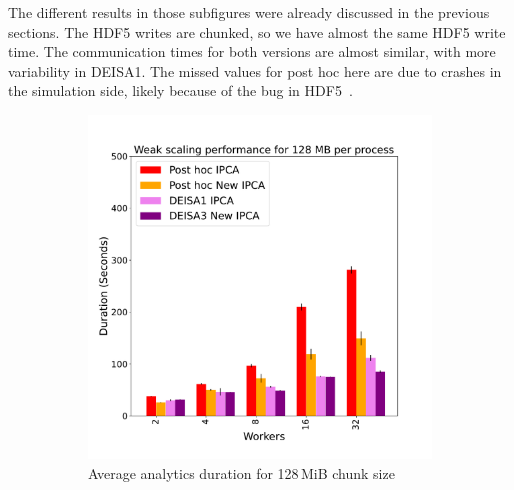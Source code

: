 The different results in those subfigures were already discussed in the previous sections. The HDF5 writes are chunked, so we have almost the same HDF5 write time.
The communication times for both \deisa versions are almost similar, with more variability in DEISA1.  
The missed values for post hoc here are due to crashes in the simulation side, likely because of the bug in HDF5~\cite{large_2023}.

\begin{figure}
     \centering
     \begin{subfigure}[b]{0.3\textwidth}
         \centering
         \includegraphics[width=\textwidth, height=\textwidth]{figures/128A_1vs3vspost1vspost2.pdf}
         \caption{Average analytics duration for 128\,MiB chunk size }
         \label{fig:A1128_1_3_p}
     \end{subfigure}
     \hfill
     \begin{subfigure}[b]{0.3\textwidth}
         \centering

\end{subfigure}
\end{figure}
